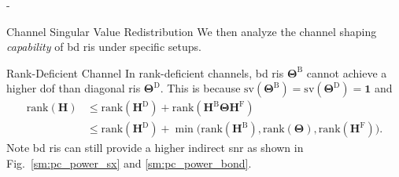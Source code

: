 \documentclass[journal]{IEEEtran}
\begin{document}
\begin{section}{-}
\begin{subsection}{Channel Singular Value Redistribution}
		We then analyze the channel shaping \emph{capability} of \gls{bd} \gls{ris} under specific setups.
		\begin{subsubsection}{Rank-Deficient Channel}
			\label{sc:pc_rank_deficient}
			In rank-deficient channels, \gls{bd} \gls{ris} $\mathbf{\Theta}^\mathrm{B}$ cannot achieve a higher \gls{dof} than diagonal \gls{ris} $\mathbf{\Theta}^\mathrm{D}$.
			This is because $\mathrm{sv}(\mathbf{\Theta}^\mathrm{B}) = \mathrm{sv}(\mathbf{\Theta}^\mathrm{D}) = \boldsymbol{1}$ and
			\begin{equation}
				\begin{split}
					\mathrm{rank}(\mathbf{H})
					& \le \mathrm{rank}(\mathbf{H}^\mathrm{D}) + \mathrm{rank}(\mathbf{H}^\mathrm{B} \mathbf{\Theta} \mathbf{H}^\mathrm{F}) \\
					& \le \mathrm{rank}(\mathbf{H}^\mathrm{D}) + \min \bigl( \mathrm{rank}(\mathbf{H}^\mathrm{B}), \mathrm{rank}(\mathbf{\Theta}), \mathrm{rank}(\mathbf{H}^\mathrm{F}) \bigr).
				\end{split}
			\end{equation}
			Note \gls{bd} \gls{ris} can still provide a higher indirect \gls{snr} as shown in Fig.~\ref{sm:pc_power_sx} and \ref{sm:pc_power_bond}.
		\end{subsubsection}



\end{subsection}
\end{section}
\end{document}
